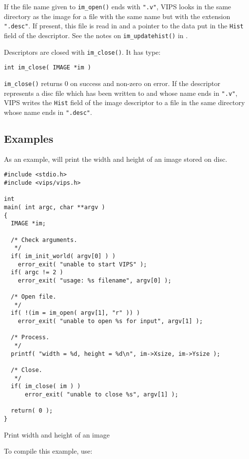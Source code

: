 If the file name given to \verb+im_open()+ ends with \verb+".v"+, VIPS
looks in the same directory as the image for a file with the same name
but with the extension \verb+".desc"+. If present, this file is read in
and a pointer to the data put in the \verb+Hist+ field of the descriptor. See
the notes on \verb+im_updatehist()+ in .  

Descriptors are closed with \verb+im_close()+. It has type:

\begin{verbatim}
int im_close( IMAGE *im )
\end{verbatim}

\verb+im_close()+ returns 0 on success and non-zero on error.
If the descriptor represents a disc file which
has been written to and whose name ends in \verb+".v"+, VIPS writes the
\verb+Hist+ field of the image descriptor to a file in the same directory
whose name ends in \verb+".desc"+.

\subsection{Examples}
\label{sec:examples}

As an example,  will print the width and height
of an image stored on disc.

\begin{fig2}
\begin{verbatim}
#include <stdio.h>
#include <vips/vips.h>

int
main( int argc, char **argv )
{
  IMAGE *im;

  /* Check arguments.
   */
  if( im_init_world( argv[0] ) )
    error_exit( "unable to start VIPS" );
  if( argc != 2 )
    error_exit( "usage: %s filename", argv[0] );

  /* Open file.
   */
  if( !(im = im_open( argv[1], "r" )) )
    error_exit( "unable to open %s for input", argv[1] );

  /* Process.
   */
  printf( "width = %d, height = %d\n", im->Xsize, im->Ysize );

  /* Close.
   */
  if( im_close( im ) )
      error_exit( "unable to close %s", argv[1] );

  return( 0 );
}
\end{verbatim}
\label{fg:widthheight}
\caption{Print width and height of an image}
\end{fig2}

To compile this example, use:

